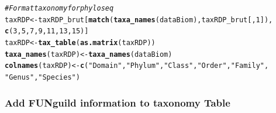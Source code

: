 \documentclass[12pt]{article}\usepackage[]{graphicx}\usepackage[]{color}
\makeatletter
\newcommand{\hlnum}[1]{\textcolor[rgb]{0.686,0.059,0.569}{#1}}%
\newcommand{\hlstr}[1]{\textcolor[rgb]{0.192,0.494,0.8}{#1}}%
\newcommand{\hlcom}[1]{\textcolor[rgb]{0.678,0.584,0.686}{\textit{#1}}}%
\newcommand{\hlstd}[1]{\textcolor[rgb]{0.345,0.345,0.345}{#1}}%
\newcommand{\hlkwb}[1]{\textcolor[rgb]{0.69,0.353,0.396}{#1}}%
\newcommand{\hlkwd}[1]{\textcolor[rgb]{0.737,0.353,0.396}{\textbf{#1}}}%
\newenvironment{kframe}{%
 \def\at@end@of@kframe{}%
 \ifinner\ifhmode%
  \def\at@end@of@kframe{\end{minipage}}%
  \begin{minipage}{\columnwidth}%
 \fi\fi%
 \def\FrameCommand##1{\hskip\@totalleftmargin \hskip-\fboxsep
 \colorbox{shadecolor}{##1}\hskip-\fboxsep
     \hskip-\linewidth \hskip-\@totalleftmargin \hskip\columnwidth}%
 \MakeFramed {\advance\hsize-\width
   \@totalleftmargin\z@ \linewidth\hsize
   \@setminipage}}%
 {\par\unskip\endMakeFramed%
 \at@end@of@kframe}
\newenvironment{knitrout}{}{} %
\numberwithin{figure}{section}
\makeatother
\begin{document}
\begin{knitrout}\small
{}\color{fgcolor}\begin{kframe}
\begin{alltt}
\hlcom{# Format taxonomy for phyloseq}
\hlstd{taxRDP} \hlkwb{<-} \hlstd{taxRDP_brut[}\hlkwd{match}\hlstd{(}\hlkwd{taxa_names}\hlstd{(dataBiom), taxRDP_brut[,} \hlnum{1}\hlstd{]),}
                       \hlkwd{c}\hlstd{(}\hlnum{3}\hlstd{,} \hlnum{5}\hlstd{,} \hlnum{7}\hlstd{,} \hlnum{9}\hlstd{,} \hlnum{11}\hlstd{,} \hlnum{13}\hlstd{,} \hlnum{15}\hlstd{)]}
\hlstd{taxRDP} \hlkwb{<-} \hlkwd{tax_table}\hlstd{(}\hlkwd{as.matrix}\hlstd{(taxRDP))}
\hlkwd{taxa_names}\hlstd{(taxRDP)} \hlkwb{<-} \hlkwd{taxa_names}\hlstd{(dataBiom)}
\hlkwd{colnames}\hlstd{(taxRDP)} \hlkwb{<-} \hlkwd{c}\hlstd{(}\hlstr{"Domain"}\hlstd{,} \hlstr{"Phylum"}\hlstd{,} \hlstr{"Class"}\hlstd{,} \hlstr{"Order"}\hlstd{,} \hlstr{"Family"}\hlstd{,}
                      \hlstr{"Genus"}\hlstd{,} \hlstr{"Species"}\hlstd{)}
\end{alltt}
\end{kframe}
\end{knitrout}

\subsubsection{Add FUNguild information to taxonomy Table}
\end{document}
